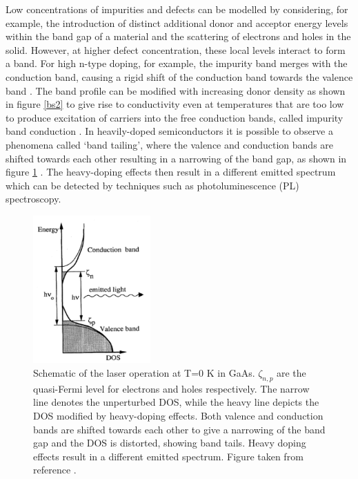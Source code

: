 Low concentrations of impurities and defects can be modelled by considering, for example, the introduction of distinct additional donor and acceptor energy levels within the band gap of a material and the scattering of electrons and holes in the solid. However, at higher defect concentration, these local levels interact to form a band. For high n-type doping, for example, the impurity band merges with the conduction band, causing a rigid shift of the conduction band towards the valence band \cite{Pankove}. The band profile can be modified with increasing donor density as shown in figure \ref{bs2} to give rise to conductivity even at temperatures that are too low to produce excitation of carriers into the free conduction bands, called impurity band conduction \cite{small_semiconductor2}.
In heavily-doped semiconductors it is possible to observe a phenomena called `band tailing', where the valence and conduction bands are shifted towards each other resulting in a narrowing of the band gap, as shown in figure \ref{pankove_band_tailing} \cite{Pankove}. The heavy-doping effects then result in a different emitted spectrum which can be detected by techniques such as photoluminescence (PL) spectroscopy. 

\begin{figure}[h!]
  \centering
    \includegraphics[width=0.4\textwidth]{figures/pankove_band_tailing.png}
    \caption{Schematic of the laser operation at T=0 K in GaAs. $\zeta_{n,p}$ are the quasi-Fermi level for electrons and holes respectively. The narrow line denotes the unperturbed DOS, while the heavy line depicts the DOS modified by heavy-doping effects. Both valence and conduction bands are shifted towards each other to give a narrowing of the band gap and the DOS is distorted, showing band tails. Heavy doping effects result in a different emitted spectrum. Figure taken from reference .}
  \label{pankove_band_tailing}
\end{figure}

